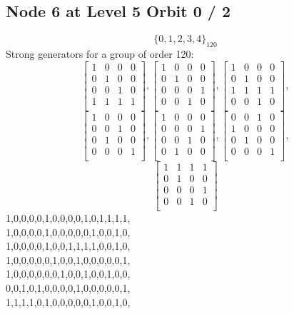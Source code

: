 \subsection*{Node 6 at Level 5 Orbit 0 / 2}
$$
\{ 0, 1, 2, 3, 4 \}_{120}$$
{\small\arraycolsep=2pt
Strong generators for a group of order 120:
$$
\left[
\begin{array}{*{4}{r}}
1 & 0 & 0 & 0\\
0 & 1 & 0 & 0\\
0 & 0 & 1 & 0\\
1 & 1 & 1 & 1\\
\end{array}
\right]
, 
\left[
\begin{array}{*{4}{r}}
1 & 0 & 0 & 0\\
0 & 1 & 0 & 0\\
0 & 0 & 0 & 1\\
0 & 0 & 1 & 0\\
\end{array}
\right]
, 
\left[
\begin{array}{*{4}{r}}
1 & 0 & 0 & 0\\
0 & 1 & 0 & 0\\
1 & 1 & 1 & 1\\
0 & 0 & 1 & 0\\
\end{array}
\right]
, 
$$
$$
\left[
\begin{array}{*{4}{r}}
1 & 0 & 0 & 0\\
0 & 0 & 1 & 0\\
0 & 1 & 0 & 0\\
0 & 0 & 0 & 1\\
\end{array}
\right]
, 
\left[
\begin{array}{*{4}{r}}
1 & 0 & 0 & 0\\
0 & 0 & 0 & 1\\
0 & 0 & 1 & 0\\
0 & 1 & 0 & 0\\
\end{array}
\right]
, 
\left[
\begin{array}{*{4}{r}}
0 & 0 & 1 & 0\\
1 & 0 & 0 & 0\\
0 & 1 & 0 & 0\\
0 & 0 & 0 & 1\\
\end{array}
\right]
, 
$$
$$
\left[
\begin{array}{*{4}{r}}
1 & 1 & 1 & 1\\
0 & 1 & 0 & 0\\
0 & 0 & 0 & 1\\
0 & 0 & 1 & 0\\
\end{array}
\right]
$$
1,0,0,0,0,1,0,0,0,0,1,0,1,1,1,1,\\
1,0,0,0,0,1,0,0,0,0,0,1,0,0,1,0,\\
1,0,0,0,0,1,0,0,1,1,1,1,0,0,1,0,\\
1,0,0,0,0,0,1,0,0,1,0,0,0,0,0,1,\\
1,0,0,0,0,0,0,1,0,0,1,0,0,1,0,0,\\
0,0,1,0,1,0,0,0,0,1,0,0,0,0,0,1,\\
1,1,1,1,0,1,0,0,0,0,0,1,0,0,1,0,\\
}
